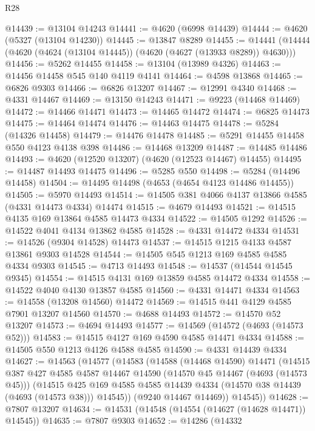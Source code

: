 \begin{lexlean}{R28}
\begin{coremodule}
@14439 := @13104 @14243
@14441 := @4620 (@6998 @14439)
@14444 := @4620 (@5327 (@13104 @14230))
@14445 := @13847 @8289
@14455 := @14441 (@14444 (@4620 (@4624 (@13104 @14445)) (@4620 (@4627 (@13933 @8289)) @4630)))
@14456 := @5262 @14455
@14458 := @13104 (@13989 @4326)
@14463 := @14456 @14458 @545 @140 @4119 @4141
@14464 := @4598 @13868
@14465 := @6826 @9303
@14466 := @6826 @13207
@14467 := @12991 @4340
@14468 := @4331 @14467
@14469 := @13150 @14243
@14471 := @9223 (@14468 @14469)
@14472 := @14466 @14471
@14473 := @14465 @14472
@14474 := @6825 @14473
@14475 := @14464 @14474
@14476 := @14463 @14475
@14478 := @5284 (@14326 @14458)
@14479 := @14476 @14478
@14485 := @5291 @14455 @14458 @550 @4123 @4138 @398
@14486 := @14468 @13209
@14487 := @14485 @14486
@14493 := @4620 (@12520 @13207) (@4620 (@12523 @14467) @14455)
@14495 := @14487 @14493 @14475
@14496 := @5285 @550
@14498 := @5284 (@14496 @14458)
@14504 := @14495 @14498 (@4653 (@4654 @4123 @14486 @14455))
@14505 := @5970 @14493
@14514 := @14505 @381 @4066 @4137 @13866 @4585 (@4331 @14473 @4334) @14474
@14515 := @4679 @14493
@14521 := @14515 @4135 @169 @13864 @4585 @14473 @4334
@14522 := @14505 @1292
@14526 := @14522 @4041 @4134 @13862 @4585
@14528 := @4331 @14472 @4334
@14531 := @14526 (@9304 @14528) @14473
@14537 := @14515 @1215 @4133 @4587 @13861 @9303 @14528
@14544 := @14505 @545 @1213 @169 @4585 @4585 @4334 @9303
@14545 := @4713 @14493
@14548 := @14537 (@14544 @14545 @9345)
@14554 := @14515 @4131 @169 @13859 @4585 @14472 @4334
@14558 := @14522 @4040 @4130 @13857 @4585
@14560 := @4331 @14471 @4334
@14563 := @14558 (@13208 @14560) @14472
@14569 := @14515 @441 @4129 @4585 @7901 @13207 @14560
@14570 := @4688 @14493
@14572 := @14570 @52 @13207
@14573 := @4694 @14493
@14577 := @14569 (@14572 (@4693 (@14573 @52)))
@14583 := @14515 @4127 @169 @4590 @4585 @14471 @4334
@14588 := @14505 @550 @1213 @4126 @4588 @4585
@14590 := @4331 @14439 @4334
@14627 := @14563
    (@14577
      (@14583
        (@14588
          (@14468 @14590)
          @14471
          (@14515
            @387
            @427
            @4585
            @4587
            @14467
            @14590
            (@14570 @45 @14467 (@4693 (@14573 @45)))
            (@14515
              @425
              @169
              @4585
              @4585
              @14439
              @4334
              (@14570 @38 @14439 (@4693 (@14573 @38)))
              @14545))
          (@9240 @14467 @14469))
        @14545))
@14628 := @7807 @13207
@14634 := @14531 (@14548 (@14554 (@14627 (@14628 @14471)) @14545))
@14635 := @7807 @9303
@14652 := @14286
    (@14332

\end{coremodule}
\end{lexlean}

